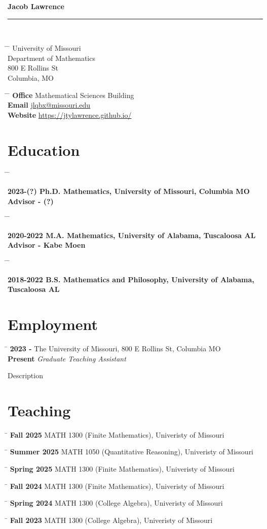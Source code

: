 \documentclass[10pt]{article}
\newlength{\smallertextwidth}
\newcommand{\job}[5]{
    \begin{tabbing}
    \hspace{2cm} \= \kill
    \textbf{#1} \> #3 \\
    \textbf{#2} \>\+ \textit{#4} \\
    \begin{minipage}{\smallertextwidth}
    \vspace{2mm}
    #5
    \end{minipage}
    \end{tabbing}
    \vspace{2mm}
}
\newcommand{\teaching}[4]{
    \begin{tabbing}
        \hspace{2.5cm} \= \kill
        \textbf{#1} \> #2 (#3), #4
    \end{tabbing}
}
\newcommand{\tabbedblock}[1]{
    \begin{tabbing}
        \hspace{2cm} \= \hspace{4cm} \= \kill
        #1
    \end{tabbing}
}
\renewcommand{\title}[1]{
    {\huge{{\textbf{#1}}}}\\
    \rule{\textwidth}{0.5mm}\\
}
\begin{document}
\title{Jacob Lawrence}


\parbox{0.5\textwidth}{
    \begin{tabbing}
        \hspace{3cm} \= \hspace{4cm} \= \kill
        University of Missouri \\
        Department of Mathematics\\
        800 E Rollins St\\
        Columbia, MO
    \end{tabbing}
}
\hfill
\parbox{0.5\textwidth}{
    \begin{tabbing}
        \hspace{1.75cm} \= \hspace{4cm} \= \kill
        {\bf Office}  Mathematical Sciences Building \\
        {\bf Email} \>\href{mailto:jlqbx@missouri.edu}{jlqbx@missouri.edu} \\
        {\bf Website} \>\href{https://jtylawrence.github.io/}{https://jtylawrence.github.io/}
    \end{tabbing}
}


\section{Education}

\tabbedblock{
    \bf{2023-(?)} \> Ph.D. Mathematics, University of Missouri, Columbia MO \\ [5pt]
    \> Advisor - (?)
}

\tabbedblock{
    \bf{2020-2022} \> M.A. Mathematics, University of Alabama, Tuscaloosa AL\\ [5pt]
    \> Advisor - Kabe Moen
}

\tabbedblock{
    \bf{2018-2022} \> B.S. Mathematics and Philosophy, University of Alabama, Tuscaloosa AL
}


\section{Employment}
\job
{2023 - }{Present}
{The University of Missouri, 800 E Rollins St, Columbia MO}
{Graduate Teaching Assistant}
{Description}


\section{Teaching}

\teaching{Fall 2025}{MATH 1300}{Finite Mathematics}{Univeristy of Missouri}
\teaching{Summer 2025}{MATH 1050}{Quantitative Reasoning}{Univeristy of Missouri}
\teaching{Spring 2025}{MATH 1300}{Finite Mathematics}{Univeristy of Missouri}
\teaching{Fall 2024}{MATH 1300}{Finite Mathematics}{Univeristy of Missouri}
\teaching{Spring 2024}{MATH 1300}{College Algebra}{Univeristy of Missouri}
\teaching{Fall 2023}{MATH 1300}{College Algebra}{Univeristy of Missouri}
\end{document}

